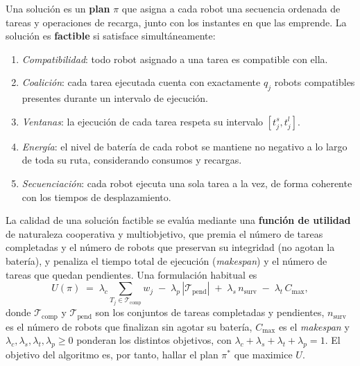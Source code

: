 \begin{definicion} \label{def:solucion} Una solución es un \textbf{plan} $\pi$ que asigna a cada robot una secuencia ordenada de tareas y operaciones de recarga, junto con los instantes en que las emprende. La solución es \textbf{factible} si satisface simultáneamente: \begin{enumerate}   
    \item \emph{Compatibilidad}: todo robot asignado a una tarea es compatible con ella.   
    
    \item \emph{Coalición}: cada tarea ejecutada cuenta con exactamente $q_j$ robots compatibles presentes durante un intervalo de ejecución.
    
    \item \emph{Ventanas}: la ejecución de cada tarea respeta su intervalo $[t_j^s,t_j^l]$.   
    
    \item \emph{Energía}: el nivel de batería de cada robot se mantiene no negativo a lo largo de toda su ruta, considerando consumos y recargas. 
    
    \item \emph{Secuenciación}: cada robot ejecuta una sola tarea a la vez, de forma coherente con los tiempos de desplazamiento. 
\end{enumerate} 
\end{definicion}

La calidad de una solución factible se evalúa mediante una \textbf{función de utilidad} de naturaleza cooperativa y multiobjetivo, que premia el número de tareas completadas y el número de robots que preservan su integridad (no agotan la batería), y penaliza el tiempo total de ejecución (\textit{makespan}) y el número de tareas que quedan pendientes. Una formulación habitual es 
\begin{equation} \label{eq:objetivo} 
U(\pi) \;=\; \lambda_c \sum_{T_j\in\mathcal{T}_{\mathrm{comp}}} w_j \;-\; \lambda_p\, |\mathcal{T}_{\mathrm{pend}}|   \;+\; \lambda_s\, n_{\mathrm{surv}}     \;-\; \lambda_t\, C_{\max}, 
\end{equation} 
donde $\mathcal{T}_{\mathrm{comp}}$ y $\mathcal{T}_{\mathrm{pend}}$ son los conjuntos de tareas completadas y pendientes, $n_{\mathrm{surv}}$ es el número de robots que finalizan sin agotar su batería, $C_{\max}$ es el \textit{makespan} y $\lambda_c,\lambda_s,\lambda_t,\lambda_p\ge 0$ ponderan los distintos objetivos, con $\lambda_c+\lambda_s+\lambda_t+\lambda_p = 1$. El objetivo del algoritmo es, por tanto, hallar el plan $\pi^*$ que maximice $U$.


